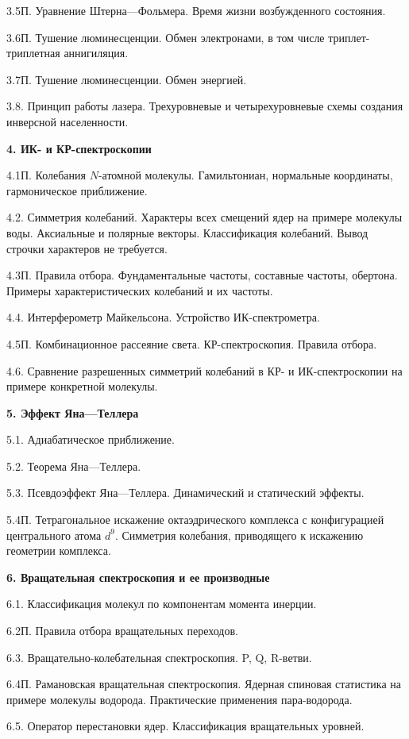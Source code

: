 3.5П. Уравнение Штерна—Фольмера. Время жизни возбужденного состояния.\par
3.6П. Тушение люминесценции. Обмен электронами, в том числе триплет-триплетная аннигиляция.\par
3.7П. Тушение люминесценции. Обмен энергией.\par
3.8. Принцип работы лазера. Трехуровневые и четырехуровневые схемы создания инверсной населенности.\par
\textbf{4. ИК- и КР-спектроскопии}\par
4.1П. Колебания $N$-атомной молекулы. Гамильтониан, нормальные координаты, гармоническое приближение.\par
4.2. Симметрия колебаний. Характеры всех смещений ядер на примере молекулы воды. Аксиальные и полярные векторы. Классификация колебаний. Вывод строчки характеров не требуется.\par
4.3П. Правила отбора. Фундаментальные частоты, составные частоты, обертона. Примеры характеристических колебаний и их частоты.\par
4.4. Интерферометр Майкельсона. Устройство ИК-спектрометра.\par
4.5П. Комбинационное рассеяние света. КР-спектроскопия. Правила отбора.\par
4.6. Сравнение разрешенных симметрий колебаний в КР- и ИК-спектроскопии на примере конкретной молекулы.\par
\textbf{5. Эффект Яна—Теллера}\par
5.1. Адиабатическое приближение.\par
5.2. Теорема Яна—Теллера.\par
5.3. Псевдоэффект Яна—Теллера. Динамический и статический эффекты.\par
5.4П. Тетрагональное искажение октаэдрического комплекса с конфигурацией центрального атома $d^9$. Симметрия колебания, приводящего к искажению геометрии комплекса.\par
\textbf{6. Вращательная спектроскопия и ее производные}\par
6.1. Классификация молекул по компонентам момента инерции.\par
6.2П. Правила отбора вращательных переходов.\par
6.3. Вращательно-колебательная спектроскопия. P, Q, R-ветви.\par
6.4П. Рамановская вращательная спектроскопия. Ядерная спиновая статистика на примере молекулы водорода. Практические применения пара-водорода.\par
6.5. Оператор перестановки ядер. Классификация вращательных уровней.\par

